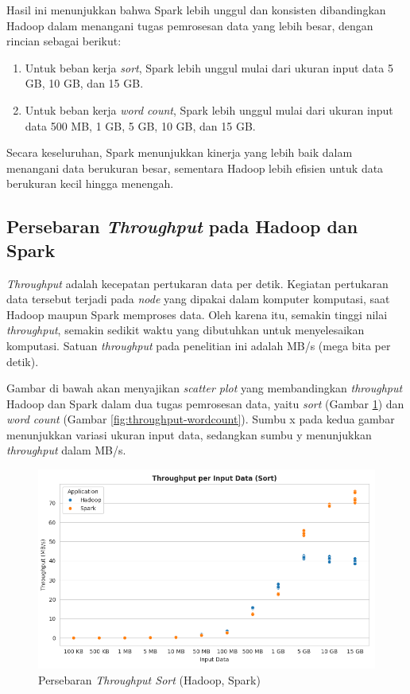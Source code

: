 Hasil ini menunjukkan bahwa Spark lebih unggul dan konsisten dibandingkan Hadoop dalam menangani tugas pemrosesan data yang lebih besar, dengan rincian sebagai berikut:
\begin{enumerate}
\item Untuk beban kerja \textit{sort}, Spark lebih unggul mulai dari ukuran input data 5 GB, 10 GB, dan 15 GB.
\item Untuk beban kerja \textit{word count}, Spark lebih unggul mulai dari ukuran input data 500 MB, 1 GB, 5 GB, 10 GB, dan 15 GB.
\end{enumerate}

Secara keseluruhan, Spark menunjukkan kinerja yang lebih baik dalam menangani data berukuran besar, sementara Hadoop lebih efisien untuk data berukuran kecil hingga menengah.

\subsection {Persebaran \textit{Throughput} pada Hadoop dan Spark}

\textit{Throughput} adalah kecepatan pertukaran data per detik. Kegiatan pertukaran data tersebut terjadi pada \textit{node} yang dipakai dalam komputer komputasi, saat Hadoop maupun Spark memproses data. Oleh karena itu, semakin tinggi nilai \textit{throughput}, semakin sedikit waktu yang dibutuhkan untuk menyelesaikan komputasi. Satuan \textit{throughput} pada penelitian ini adalah MB/s (mega bita per detik).

Gambar di bawah akan menyajikan \textit{scatter plot} yang membandingkan \textit{throughput} Hadoop dan Spark dalam dua tugas pemrosesan data, yaitu \textit{sort} (Gambar \ref{fig:throughput-sort}) dan \textit{word count} (Gambar \ref{fig:throughput-wordcount}). Sumbu x pada kedua gambar menunjukkan variasi ukuran input data, sedangkan sumbu y menunjukkan \textit{throughput} dalam MB/s.

\begin{figure}[h]
    \centering
    \includegraphics[width=1\textwidth]{figures/ch04/1-throughput-sort.png}
    \caption{Persebaran \textit{Throughput Sort} (Hadoop, Spark)}
    \label{fig:throughput-sort}
\end{figure}

